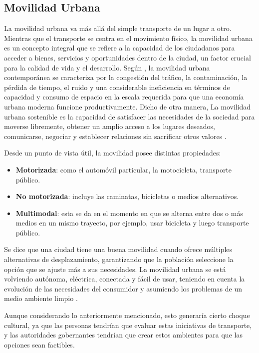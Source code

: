 \subsection{Movilidad Urbana}
La movilidad urbana va más allá del simple transporte de un lugar a otro. 
Mientras que el transporte se centra en el movimiento físico, la movilidad urbana es un concepto 
integral que se refiere a la capacidad de los ciudadanos para acceder a bienes, servicios y oportunidades 
dentro de la ciudad, un factor crucial para la calidad de vida y el desarrollo.
Según \cite{ceder_urban_2021}, la movilidad urbana contemporánea 
se caracteriza por la congestión del tráfico, la contaminación, 
la pérdida de tiempo, el ruido y una considerable ineficiencia en 
términos de capacidad y consumo de espacio en la escala requerida 
para que una economía urbana moderna funcione productivamente.
Dicho de otra manera, La movilidad urbana sostenible es la capacidad de satisfacer 
las necesidades de la sociedad para moverse libremente, obtener un amplio 
acceso a los lugares deseados, comunicarse, negociar y establecer 
relaciones sin sacrificar otros valores \cite{costa_urban_2017}.

Desde un punto de vista útil, la movilidad posee distintas propiedades:
\begin{itemize}
    \item \textbf{Motorizada}: como el automóvil particular, la motocicleta, transporte público.
    \item \textbf{No motorizada}: incluye las caminatas, bicicletas o medios alternativos.
    \item \textbf{Multimodal}: esta se da en el momento en que se alterna entre dos o más medios
    en un mismo trayecto, 
    por ejemplo, usar bicicleta y luego transporte público.
\end{itemize}

Se dice que una ciudad tiene una buena movilidad cuando ofrece múltiples alternativas 
de desplazamiento, garantizando que la población seleccione la opción que se ajuste 
más a sus necesidades. La movilidad urbana se está volviendo autónoma, eléctrica, 
conectada y fácil de usar, teniendo en cuenta la evolución de las necesidades del consumidor 
y asumiendo los problemas de un medio ambiente limpio \cite{mavlutova_urban_2023}.

Aunque considerando lo anteriormente mencionado, esto generaría cierto choque cultural, 
ya que las personas tendrían que evaluar estas iniciativas de transporte, y las autoridades 
gobernantes tendrían que crear estos ambientes para que las opciones sean factibles.

